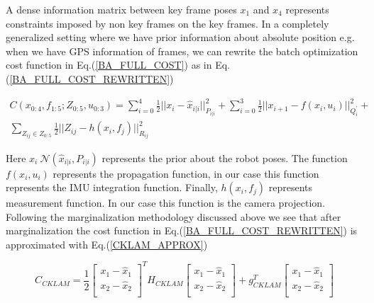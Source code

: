 A dense information matrix between key frame poses $x_1$ and $x_4$ represents constraints imposed by non key frames on the key frames. In a completely generalized setting where we have prior information about absolute position e.g. when we have GPS information of frames, we can rewrite the batch optimization cost function in Eq.(\ref{BA_FULL_COST}) as in Eq.(\ref{BA_FULL_COST_REWRITTEN})

\begin{equation}
  \begin{split}
    C(x_{0:4},f_{1:5};Z_{0:5},u_{0:3}) = \sum_{i=0}^4 \frac{1}{2}||x_i-\hat x_{i|i}||^2_{P_{i|i}} + \sum_{i=0}^3 {\frac{1}{2}||x_{i+1} - f(x_i, u_i)||^2_{Q_i^'}} +\\ \sum_{Z_{ij}\in Z_{0:5}} {\frac{1}{2}||Z_{ij}-h(x_i,f_j)||^2_{R_{ij}}}
    \label{BA_FULL_COST_REWRITTEN}
  \end{split}
\end{equation}

Here $x_i ~ \mathcal{N}(\hat x_{i|i}, P_{i|i})$ represents the prior about the robot poses. The function $f(x_i, u_i)$ represents the propagation function, in our case this function represents the IMU integration function. Finally, $h(x_i,f_j)$ represents measurement function. In our case this function is the camera projection. Following the marginalization methodology discussed above we see that after marginalization the cost function in Eq.(\ref{BA_FULL_COST_REWRITTEN}) is approximated with Eq.(\ref{CKLAM_APPROX})

\begin{equation}
	C_{CKLAM} = \frac{1}{2}
							\begin{bmatrix} 
								x_{1} - \hat x_{1} \\
								x_{2} - \hat x_{2} \\
							\end{bmatrix}^T H_{CKLAM} 
							\begin{bmatrix} 
								x_{1} - \hat x_{1} \\
								x_{2} - \hat x_{2} \\
							\end{bmatrix} + g_{CKLAM}^T
							\begin{bmatrix} 
								x_{1} - \hat x_{1} \\
								x_{2} - \hat x_{2} \\
							\end{bmatrix}
	\label{CKLAM_APPROX}
\end{equation}

